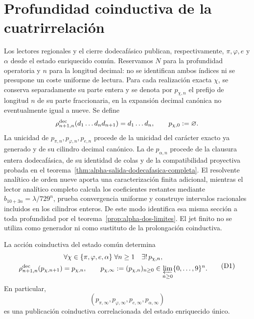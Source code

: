 \section{Profundidad coinductiva de la cuatrirrelación}
\label{sec:profundidad-cuatrirrelacion-ch}

Los lectores regionales y el cierre dodecafásico publican, respectivamente,
\(\pi,\varphi,e\) y \(\alpha\) desde el estado enriquecido común. Reservamos
\(N\) para la profundidad operatoria y \(n\) para la longitud decimal:
no se identifican ambos índices ni se presupone un coste uniforme de lectura.
Para cada realización exacta \(\chi\), se conserva separadamente su parte
entera y se denota por \(p_{\chi,n}\) el prefijo de longitud \(n\) de su
parte fraccionaria, en la expansión decimal canónica no eventualmente igual
a nueve. Se define
\[
 \rho^{\rm dec}_{n+1,n}(d_1\ldots d_nd_{n+1})=d_1\ldots d_n,
 \qquad p_{\chi,0}:=\varnothing.
\]
La unicidad de \(p_{\pi,n},p_{\varphi,n},p_{e,n}\) procede de la unicidad del
carácter exacto ya generado y de su cilindro decimal canónico. La de
\(p_{\alpha,n}\) procede de la clausura entera dodecafásica, de su identidad
de colas y de la compatibilidad proyectiva probada en el
teorema~\ref{thm:alpha-salida-dodecafasica-completa}. El resolvente analítico
de orden nueve aporta una caracterización finita adicional, mientras el
lector analítico completo calcula los coeficientes restantes mediante
\(b_{10+3n}=\lambda/729^n\), prueba convergencia uniforme y construye
intervalos racionales incluidos en los cilindros enteros. De este modo
identifica esa misma sección a toda profundidad por el
teorema~\ref{prop:alpha-dos-limites}. El jet finito no se utiliza como
generador ni como sustituto de la prolongación coinductiva.

\begin{theorem}
\label{thm:profundidad-cuatrirrelacion-ch}
La acción coinductiva del estado común determina
\[
 \begin{gathered}
  \forall\chi\in\{\pi,\varphi,e,\alpha\}\;
  \forall n\ge1\quad\exists!\,p_{\chi,n},\\
  \rho^{\rm dec}_{n+1,n}(p_{\chi,n+1})=p_{\chi,n},
  \qquad
  p_{\chi,\infty}:=(p_{\chi,n})_{n\ge0}
  \in\varprojlim_{n\ge0}\{0,\ldots,9\}^{n}.
 \end{gathered}
\tag{D1}
\label{eq:profundidad-cuatrirrelacion-ch}
\]
En particular,
\[
 (p_{\pi,\infty},p_{\varphi,\infty},p_{e,\infty},p_{\alpha,\infty})
\tag{D2}
\label{eq:cuatrirrelacion-infinita-ch}
\]
es una publicación coinductiva correlacionada del estado enriquecido único.
\end{theorem}

